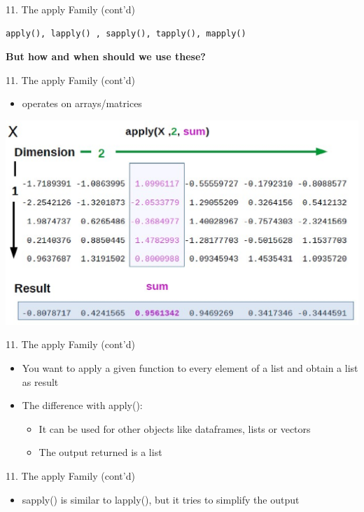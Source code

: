 \documentclass[14pt, aspectratio=169, sectionpage=simple, xclolor=table]{beamer}
\begin{document}
\begin{frame}[fragile]{11. The apply Family  (cont'd)}
\begin{verbatim}
apply(), lapply() , sapply(), tapply(), mapply()
\end{verbatim}
\textbf{But how and when should we use these?}

\end{frame}
\begin{frame}[fragile]{11. The apply Family  (cont'd)}
\nl
\begin{itemize}
\item operates on arrays/matrices
\end{itemize}
\includegraphics[scale=0.4]{Figures/apply.eps}

\end{frame}
\begin{frame}[fragile]{11. The apply Family  (cont'd)}
\begin{itemize}
\item You want to apply a given function to every element of a list and obtain a list as result
\item The difference with apply():
\nl
\begin{itemize}
\item It can be used for other objects like dataframes, lists or vectors
\item The output returned is a list
\end{itemize}
\end{itemize}
\end{frame}
\begin{frame}[fragile]{11. The apply Family  (cont'd)}
\begin{itemize}
\item sapply() is similar to lapply(), but it tries to simplify the output 
\end{itemize}
\end{frame}
\end{document}
